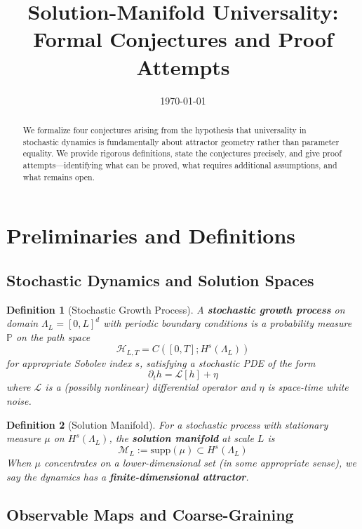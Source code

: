 \documentclass[11pt]{article}
\title{Solution-Manifold Universality: \\Formal Conjectures and Proof Attempts}
\author{}
\date{\today}
\newtheorem{definition}{Definition}[section]
\newcommand{\Prob}{\mathbb{P}}
\newcommand{\calH}{\mathcal{H}}
\newcommand{\calM}{\mathcal{M}}
\newcommand{\supp}{\mathrm{supp}}
\begin{document}
\maketitle

\begin{abstract}
We formalize four conjectures arising from the hypothesis that universality in stochastic dynamics is fundamentally about attractor geometry rather than parameter equality. We provide rigorous definitions, state the conjectures precisely, and give proof attempts—identifying what can be proved, what requires additional assumptions, and what remains open.
\end{abstract}

\tableofcontents

\section{Preliminaries and Definitions}

\subsection{Stochastic Dynamics and Solution Spaces}

\begin{definition}[Stochastic Growth Process]
A \textbf{stochastic growth process} on domain $\Lambda_L = [0,L]^d$ with periodic boundary conditions is a probability measure $\Prob$ on the path space
\[
\calH_{L,T} = C([0,T]; H^s(\Lambda_L))
\]
for appropriate Sobolev index $s$, satisfying a stochastic PDE of the form
\[
\partial_t h = \mathcal{L}[h] + \eta
\]
where $\mathcal{L}$ is a (possibly nonlinear) differential operator and $\eta$ is space-time white noise.
\end{definition}

\begin{definition}[Solution Manifold]
For a stochastic process with stationary measure $\mu$ on $H^s(\Lambda_L)$, the \textbf{solution manifold} at scale $L$ is
\[
\calM_L := \supp(\mu) \subset H^s(\Lambda_L)
\]
When $\mu$ concentrates on a lower-dimensional set (in some appropriate sense), we say the dynamics has a \textbf{finite-dimensional attractor}.
\end{definition}

\subsection{Observable Maps and Coarse-Graining}
\end{document}
